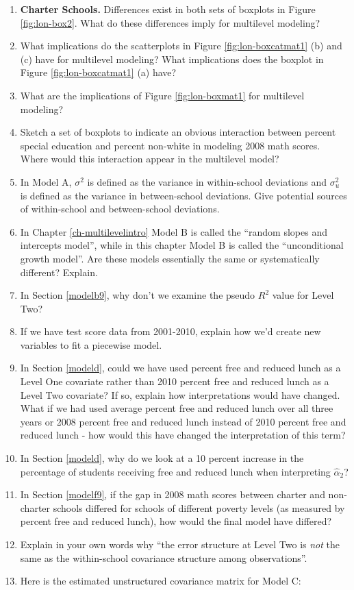 \documentclass[
]{krantz}
\begin{document}
\begin{enumerate}
\def\labelenumi{\arabic{enumi}.}
\setcounter{enumi}{5}
\item
  \textbf{Charter Schools.} Differences exist in both sets of boxplots in Figure \ref{fig:lon-box2}. What do these differences imply for multilevel modeling?
\item
  What implications do the scatterplots in Figure \ref{fig:lon-boxcatmat1} (b) and (c) have for multilevel modeling? What implications does the boxplot in Figure \ref{fig:lon-boxcatmat1} (a) have?
\item
  What are the implications of Figure \ref{fig:lon-boxmat1} for multilevel modeling?
\item
  Sketch a set of boxplots to indicate an obvious interaction between percent special education and percent non-white in modeling 2008 math scores. Where would this interaction appear in the multilevel model?
\item
  In Model A, \(\sigma^2\) is defined as the variance in within-school deviations and \(\sigma^2_u\) is defined as the variance in between-school deviations. Give potential sources of within-school and between-school deviations.
\item
  In Chapter \ref{ch-multilevelintro} Model B is called the ``random slopes and intercepts model'', while in this chapter Model B is called the ``unconditional growth model''. Are these models essentially the same or systematically different? Explain.
\item
  In Section \ref{modelb9}, why don't we examine the pseudo \(R^2\) value for Level Two?
\item
  If we have test score data from 2001-2010, explain how we'd create new variables to fit a piecewise model.
\item
  In Section \ref{modeld}, could we have used percent free and reduced lunch as a Level One covariate rather than 2010 percent free and reduced lunch as a Level Two covariate? If so, explain how interpretations would have changed. What if we had used average percent free and reduced lunch over all three years or 2008 percent free and reduced lunch instead of 2010 percent free and reduced lunch - how would this have changed the interpretation of this term?
\item
  In Section \ref{modeld}, why do we look at a 10 percent increase in the percentage of students receiving free and reduced lunch when interpreting \(\hat{\alpha}_{2}\)?
\item
  In Section \ref{modelf9}, if the gap in 2008 math scores between charter and non-charter schools differed for schools of different poverty levels (as measured by percent free and reduced lunch), how would the final model have differed?
\item
  Explain in your own words why ``the error structure at Level Two is \emph{not} the same as the within-school covariance structure among observations''.
\item
  Here is the estimated unstructured covariance matrix for Model C:


\end{enumerate}
\end{document}

